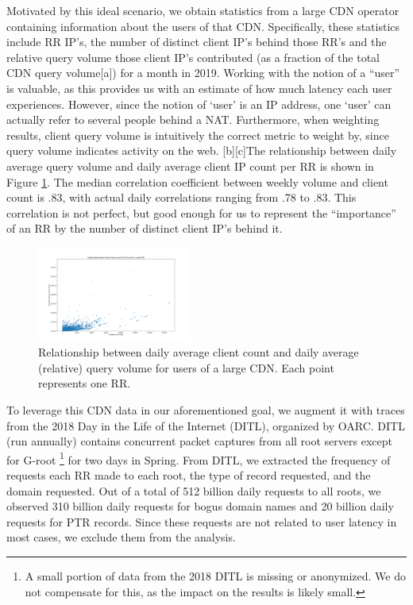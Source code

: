 \documentclass[sigconf,nonacm,10pt]{acmart}
\begin{document}
Motivated by this ideal scenario, we obtain statistics from a large CDN
operator containing information about the users of that CDN.
Specifically, these statistics include RR IP's, the number of distinct
client IP's behind those RR's and the relative query volume those client
IP's contributed (as a fraction of the total CDN query volume{[}a{]})
for a month in 2019. Working with the notion of a ``user'' is valuable,
as this provides us with an estimate of how much latency each user
experiences. However, since the notion of `user' is an IP address, one
`user' can actually refer to several people behind a NAT. Furthermore,
when weighting results, client query volume is intuitively the correct
metric to weight by, since query volume indicates activity on the web.
{[}b{]}{[}c{]}The relationship between daily average query volume and
daily average client IP count per RR is shown in Figure
\ref{fig:query_client_relationship}. The median correlation coefficient
between weekly volume and client count is .83, with actual daily
correlations ranging from .78 to .83. This correlation is not perfect,
but good enough for us to represent the ``importance'' of an RR by the
number of distinct client IP's behind it.

\begin{figure}
    \centering
    \includegraphics[width=0.45\textwidth]{figures/query_client_relationship.png}
    \caption{Relationship between daily average client count and daily average (relative) query volume for users of a large CDN. Each point represents one RR.}
    \label{fig:query_client_relationship}
\end{figure}

To leverage this CDN data in our aforementioned goal, we augment it with
traces from the 2018 Day in the Life of the Internet (DITL), organized
by OARC. DITL (run annually) contains concurrent packet captures from
all root servers except for G-root
\footnote{ A small portion of data from the 2018 DITL is missing or anonymized. We do not compensate for this, as the impact on the results is likely small. }
for two days in Spring. From DITL, we extracted the frequency of
requests each RR made to each root, the type of record requested, and
the domain requested. \break
Out of a total of 512 billion daily requests to all roots, we observed
310 billion daily requests for bogus domain names and 20 billion daily
requests for PTR records. Since these requests are not related to user
latency in most cases, we exclude them from the analysis.
\end{document}
